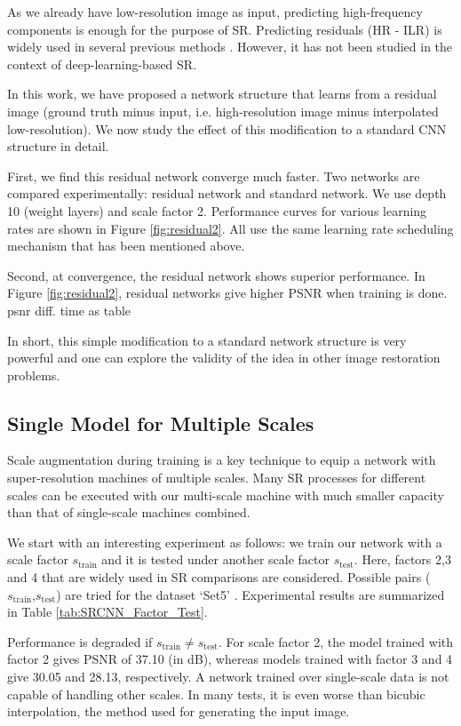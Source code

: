 \documentclass[10pt,twocolumn,letterpaper]{article}
\begin{document}
As we already have low-resolution image as input, predicting high-frequency components is enough for the purpose of SR. Predicting residuals (HR - ILR) is widely used in several previous methods \cite{Timofte2013, Timofte,zeyde2012single}. However, it has not been studied in the context of deep-learning-based SR.

In this work, we have proposed a network structure that learns from a residual image (ground truth minus input, i.e. high-resolution image minus interpolated low-resolution). We now study the effect of this modification to a standard CNN structure in detail. 

First, we find this residual network converge much faster. Two networks are compared experimentally: residual network and standard network. We use depth 10 (weight layers) and scale factor 2. Performance curves for various learning rates are shown in Figure \ref{fig:residual2}. All use the same learning rate scheduling mechanism that has been mentioned above. 

Second, at convergence, the residual network shows superior performance. In Figure \ref{fig:residual2}, residual networks give higher PSNR when training is done. {\color{red} psnr diff. time as table}

In short, this simple modification to a standard network structure is very powerful and one can explore the validity of the idea in other image restoration problems. 

\subsection{Single Model for Multiple Scales}
Scale augmentation during training is a key technique to equip a network with super-resolution machines of multiple scales. Many SR processes for different scales can be executed with our multi-scale machine with much smaller capacity than that of single-scale machines combined. 

We start with an interesting experiment as follows: we train our network with a scale factor $s_{\text{train}}$ and it is tested under another scale factor $s_{\text{test}}$. Here, factors 2,3 and 4 that are widely used in SR comparisons are considered. Possible pairs ($s_{\text{train}}$,$s_{\text{test}}$) are tried for the dataset `Set5' \cite{bevilacqua2012}. Experimental results are summarized in Table \ref{tab:SRCNN_Factor_Test}. 

Performance is degraded if $s_{\text{train}} \neq s_{\text{test}}$. For scale factor 2, the model trained with factor 2 gives PSNR of 37.10 (in dB), whereas models trained with factor 3 and 4 give 30.05 and 28.13, respectively. A network trained over single-scale data is not capable of handling other scales. In many tests, it is even worse than bicubic interpolation, the method used for generating the input image. 
\end{document}
